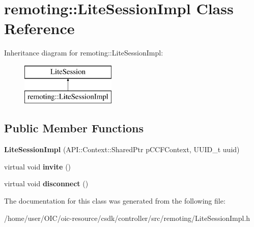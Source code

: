 \hypertarget{classremoting_1_1LiteSessionImpl}{}\section{remoting\+:\+:Lite\+Session\+Impl Class Reference}
\label{classremoting_1_1LiteSessionImpl}
Inheritance diagram for remoting\+:\+:Lite\+Session\+Impl\+:\begin{figure}[H]
\begin{center}
\leavevmode
\includegraphics[height=2.000000cm]{classremoting_1_1LiteSessionImpl}
\end{center}
\end{figure}
\subsection*{Public Member Functions}
\begin{DoxyCompactItemize}
\item 
\hypertarget{classremoting_1_1LiteSessionImpl_abfa3ba953f551f2273a261b6d072fd92}{}{\bfseries Lite\+Session\+Impl} (A\+P\+I\+::\+Context\+::\+Shared\+Ptr p\+C\+C\+F\+Context, U\+U\+I\+D\+\_\+t uuid)\label{classremoting_1_1LiteSessionImpl_abfa3ba953f551f2273a261b6d072fd92}

\item 
\hypertarget{classremoting_1_1LiteSessionImpl_a630799c0a68877c1cb97e75ca41127ad}{}virtual void {\bfseries invite} ()\label{classremoting_1_1LiteSessionImpl_a630799c0a68877c1cb97e75ca41127ad}

\item 
\hypertarget{classremoting_1_1LiteSessionImpl_af3e554403b93a5c4b7af1675482a0cf5}{}virtual void {\bfseries disconnect} ()\label{classremoting_1_1LiteSessionImpl_af3e554403b93a5c4b7af1675482a0cf5}

\end{DoxyCompactItemize}


The documentation for this class was generated from the following file\+:\begin{DoxyCompactItemize}
\item 
/home/user/\+O\+I\+C/oic-\/resource/csdk/controller/src/remoting/Lite\+Session\+Impl.\+h\end{DoxyCompactItemize}
